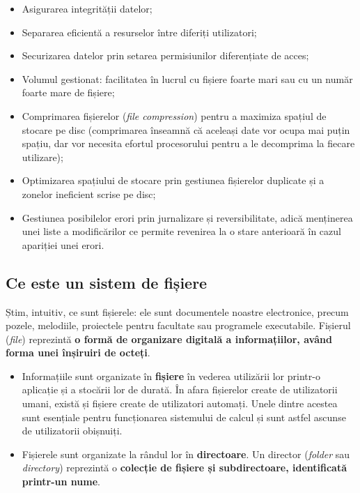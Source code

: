 \begin{itemize}
	\item Asigurarea integrității datelor;
	\item Separarea eficientă a resurselor între diferiți utilizatori;
	\item Securizarea datelor prin setarea permisiunilor diferențiate de acces;
	\item Volumul gestionat: facilitatea în lucrul cu fișiere foarte mari
		sau cu un număr foarte mare de fișiere;
	\item Comprimarea fișierelor (\textit{file compression}) pentru a
		maximiza spațiul de stocare pe disc (comprimarea înseamnă că
		aceleași date vor ocupa mai puțin spațiu, dar vor necesita
		efortul procesorului pentru a le decomprima la fiecare
		utilizare);
	\item Optimizarea spațiului de stocare prin gestiunea fișierelor
		duplicate și a zonelor ineficient scrise pe disc;
	\item Gestiunea posibilelor erori prin jurnalizare și reversibilitate,
		adică menținerea unei liste a modificărilor ce permite revenirea
		la o stare anterioară în cazul apariției unei erori.
\end{itemize}

\subsection{Ce este un sistem de fișiere}
\label{sec:file-system-baza-def}

Știm, intuitiv, ce sunt fișierele: ele sunt documentele noastre electronice,
precum pozele, melodiile, proiectele pentru facultate sau programele
executabile. Fișierul (\textit{file}) reprezintă \textbf{o formă de organizare
digitală a informațiilor, având forma unei înșiruiri de octeți}.

\begin{itemize}
	\item Informațiile sunt organizate în \textbf{fișiere} în vederea
		utilizării lor printr-o aplicație și a stocării lor de durată.
		În afara fișierelor create de utilizatorii umani, există și
		fișiere create de utilizatori automați. Unele dintre acestea
		sunt esențiale pentru funcționarea sistemului de calcul și sunt
		astfel ascunse de
		utilizatorii obișnuiți.
	\item Fișierele sunt organizate la rândul lor în \textbf{directoare}. Un
		director (\textit{folder} sau \textit{directory}) reprezintă o
		\textbf{colecție de fișiere și subdirectoare, identificată
		printr-un nume}.
\end{itemize}


